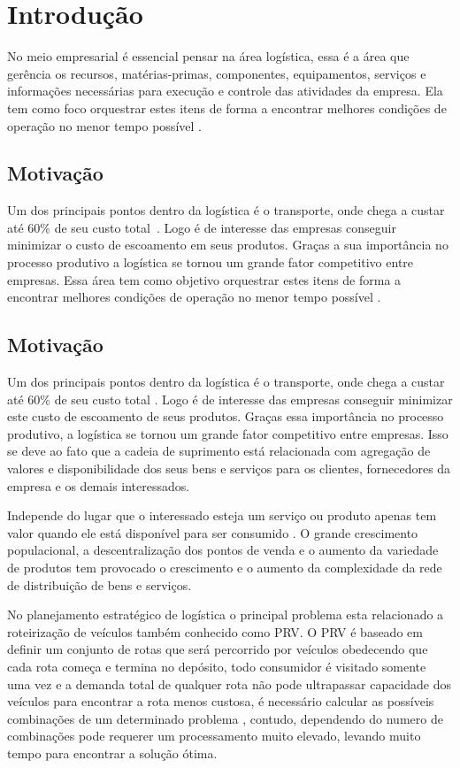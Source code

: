 \chapter[Introdução]{Introdução}

No meio empresarial é essencial pensar na área logística, essa é a área que gerência os recursos, matérias-primas, componentes, equipamentos, serviços e informações necessárias para execução e controle das atividades da empresa. 
Ela tem como foco orquestrar estes itens de forma a encontrar melhores condições de operação no menor tempo possível \cite{DIAS}.

\section{Motivação}

Um dos principais pontos dentro da logística é o transporte, onde chega a custar até 60\% de seu custo total~\cite{RODRIGUES}.
Logo é de interesse das empresas conseguir minimizar o custo de escoamento em seus produtos.
Graças a sua importância no processo produtivo a logística se tornou um grande fator competitivo entre empresas.
Essa área tem como objetivo orquestrar estes itens de forma a encontrar melhores condições de operação no menor tempo possível \cite{DIAS}.

\section{Motivação}

Um dos principais pontos dentro da logística é o transporte, onde chega a custar até 60\% de seu custo total \cite{RODRIGUES}.
Logo é de interesse das empresas conseguir minimizar este custo de escoamento de seus produtos. Graças essa importância no processo produtivo, a logística se tornou um grande fator competitivo entre empresas.
Isso se deve ao fato que a cadeia de suprimento está relacionada com agregação de valores e disponibilidade dos seus bens e serviços para os clientes, fornecedores da empresa e os demais interessados. 

Independe do lugar que o interessado esteja um serviço ou produto apenas tem valor quando ele está disponível para ser consumido \cite{TSUDA}.
O grande crescimento populacional, a descentralização dos pontos de venda e o aumento da variedade de produtos tem provocado o crescimento e o aumento da complexidade da rede de distribuição de bens e serviços.

No planejamento estratégico de logística o principal problema esta relacionado a roteirização de veículos \cite{TSUDA} também conhecido como PRV\@.
O PRV é baseado em definir um conjunto de rotas que será percorrido por veículos obedecendo que cada rota começa e termina no depósito, todo consumidor é visitado somente uma vez e a demanda total de qualquer rota não pode ultrapassar capacidade dos veículos para encontrar a rota menos custosa, é necessário calcular as possíveis combinações de um determinado problema , contudo, dependendo do numero de combinações pode requerer um processamento muito elevado, levando muito tempo para encontrar a solução ótima.

